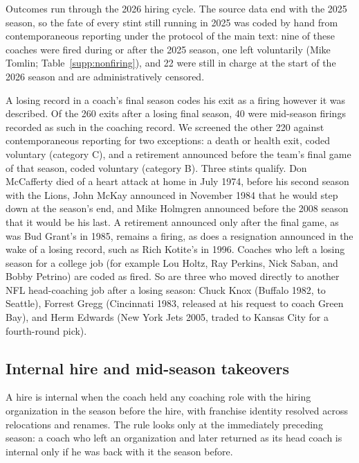 \documentclass[12pt,USenglish]{article}
\begin{document}
Outcomes run through the 2026 hiring cycle. The source data end with the 2025 season, so the
fate of every stint still running in 2025 was coded by hand from contemporaneous reporting
under the protocol of the main text: nine of these coaches were fired during or after the 2025
season, one left voluntarily (Mike Tomlin; Table~\ref{supp:nonfiring}), and 22 were still in
charge at the start of the 2026 season and are administratively censored.

A losing record in a coach's final season codes his exit as a firing however it was described.
Of the 260 exits after a losing final season, 40 were mid-season firings recorded as such in
the coaching record. We screened the other 220 against contemporaneous reporting for two
exceptions: a death or health exit, coded voluntary (category C), and a retirement announced
before the team's final game of that season, coded voluntary (category B). Three stints
qualify. Don McCafferty died of a heart attack at home in July 1974, before his second season
with the Lions, John McKay announced in November 1984 that he would
step down at the season's end, and Mike Holmgren announced before the 2008 season that it
would be his last. A retirement announced only after the final game, as was Bud Grant's in
1985, remains a firing, as does a resignation announced in the wake of a losing record, such
as Rich Kotite's in 1996. Coaches who left a losing season for a college job (for example Lou
Holtz, Ray Perkins, Nick Saban, and Bobby Petrino) are coded as fired. So are three who moved
directly to another NFL head-coaching job after a losing season: Chuck Knox (Buffalo 1982,
to Seattle), Forrest Gregg (Cincinnati 1983, released at his request to coach Green Bay), and
Herm Edwards (New York Jets 2005, traded to Kansas City for a fourth-round pick).

\subsection{Internal hire and mid-season takeovers}
\label{sec:supp_internal}

A hire is internal when the coach held any coaching role with the hiring organization in the
season before the hire, with franchise identity resolved across relocations and renames. The
rule looks only at the immediately preceding season: a coach who left an organization and
later returned as its head coach is internal only if he was back with it the season before.
\end{document}
